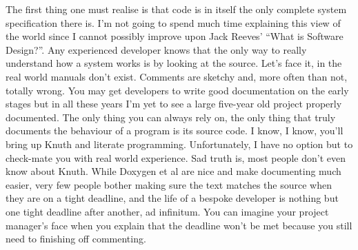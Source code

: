\documentclass{memoir}
\begin{document}
The first thing one must realise is that code is in itself the only
complete system specification there is. I'm not going to spend much
time explaining this view of the world since I cannot possibly improve
upon Jack Reeves' ``What is Software Design?''. Any experienced
developer knows that the only way to really understand how a system
works is by looking at the source. Let's face it, in the real world
manuals don't exist. Comments are sketchy and, more often than not,
totally wrong. You may get developers to write good documentation on
the early stages but in all these years I'm yet to see a large
five-year old project properly documented. The only thing you can
always rely on, the only thing that truly documents the behaviour of a
program is its source code. I know, I know, you'll bring up Knuth and
literate programming. Unfortunately, I have no option but to
check-mate you with real world experience. Sad truth is, most people
don't even know about Knuth. While Doxygen et al are nice and make
documenting much easier, very few people bother making sure the text
matches the source when they are on a tight deadline, and the life of
a bespoke developer is nothing but one tight deadline after another,
ad infinitum. You can imagine your project manager's face when you
explain that the deadline won't be met because you still need to
finishing off commenting.
\end{document}
